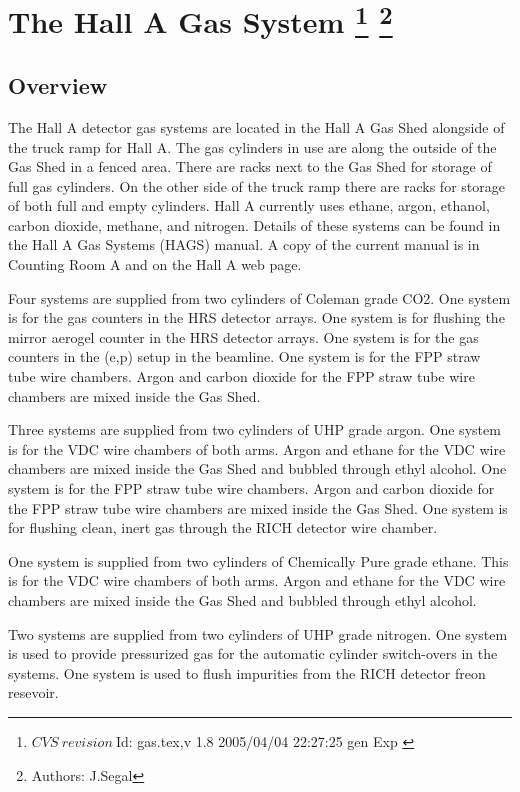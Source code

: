 \chapter[The Hall A Gas System]{The Hall A Gas System
\label{chap:hrs-det-gas}
\footnote{
  $CVS~revision~ $Id: gas.tex,v 1.8 2005/04/04 22:27:25 gen Exp $ $
}
\footnote{Authors: J.Segal }
}

\section{Overview}
The Hall A detector gas systems are located in the Hall A Gas Shed
alongside of the truck ramp for Hall A.  The gas cylinders in use
are along the outside of the Gas Shed in a fenced area.
There are racks next to
the Gas Shed for storage of full gas cylinders.  On the other side of the
truck ramp there are racks for storage of both full and empty cylinders.
Hall A currently uses ethane, argon, ethanol, carbon dioxide, methane, 
and nitrogen.
Details of these systems can be found in the Hall A Gas Systems (HAGS) manual.
A copy of the current manual is in Counting Room A and on the Hall A web page.

Four systems are supplied from two cylinders of Coleman grade CO2.
One system is for the gas \Cherenkov{} counters in the HRS detector arrays.
One system is for
flushing the mirror aerogel \Cherenkov{} counter in the HRS detector arrays.
One system is for
the gas \Cherenkov{} counters in the (e,p) setup in the beamline.
One system is for the FPP straw tube wire chambers.
Argon and carbon dioxide for the FPP straw tube wire chambers
are mixed inside the Gas Shed.

Three systems are supplied from two cylinders of UHP grade argon.
One system is for the VDC wire chambers
of both arms.  Argon and ethane for the VDC wire chambers are
mixed inside the Gas Shed and bubbled
through ethyl alcohol.
One system is for the FPP straw tube wire chambers.
Argon and carbon dioxide for the FPP straw tube wire chambers
are mixed inside the Gas Shed.
One system is for flushing clean, inert gas through the RICH detector
wire chamber.

One system is supplied from two cylinders 
of Chemically Pure grade ethane.  This is for the VDC wire chambers
of both arms.  Argon and ethane for the VDC wire chambers
are mixed inside the Gas Shed and bubbled
through ethyl alcohol.

Two systems are supplied from two cylinders of UHP grade nitrogen.
One system is used to provide pressurized
gas for the automatic cylinder switch-overs in the systems.
One system is used to flush impurities from the RICH detector
freon resevoir.


